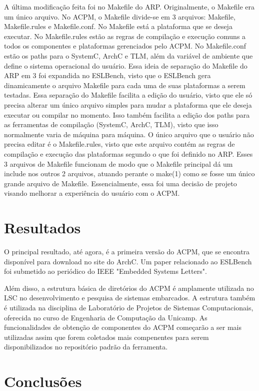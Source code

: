 \documentclass[12pt]{article}
\begin{document}
A última modificação feita foi no Makefile do ARP. Originalmente, o Makefile era
um único arquivo. No ACPM, o Makefile divide-se em 3 arquivos: Makefile,
Makefile.rules e Makefile.conf. No Makefile está a plataforma que se deseja
executar. No Makefile.rules estão as regras de compilação e execução comuns a
todos os componentes e plataformas gerenciados pelo ACPM. No Makefile.conf estão
os paths para o SystemC, ArchC e TLM, além da variável de ambiente que define o
sistema operacional do usuário. Essa ideia de separação do Makefile do ARP em 3
foi expandida no ESLBench, visto que o ESLBench gera dinamicamente o arquivo
Makefile para cada uma de suas plataformas a serem testadas. Essa separação do
Makefile facilita a edição do usuário, visto que ele só precisa alterar um único
arquivo simples para mudar a plataforma que ele deseja executar ou compilar no
momento. Isso também facilita a edição dos paths para as ferramentas de
compilação (SystemC, ArchC, TLM), visto que isso normalmente varia de máquina
para máquina. O único arquivo que o usuário não precisa editar é o
Makefile.rules, visto que este arquivo contém as regras de compilação e execução
das plataformas segundo o que foi definido no ARP. Esses 3 arquivos de Makefile
funcionam de modo que o Makefile principal dá um include nos outros 2 arquivos,
atuando perante o make(1) como se fosse um único grande arquivo de Makefile.
Essencialmente, essa foi uma decisão de projeto visando melhorar a experiência
do usuário com o ACPM.


\section{Resultados}

O principal resultado, até agora, é a primeira versão do ACPM, que se encontra
disponível para download no site do ArchC. Um paper relacionado ao ESLBench foi
submetido ao periódico do IEEE "Embedded Systems Letters".

Além disso, a estrutura básica de diretórios do ACPM é amplamente utilizada no
LSC no desenvolvimento e pesquisa de sistemas embarcados. A estrutura também é
utilizada na disciplina de Laboratório de Projetos de Sistemas Computacionais,
oferecida no curso de Engenharia de Computação da Unicamp.
As funcionalidades de obtenção de componentes do ACPM começarão a ser mais
utilizadas assim que forem coletados mais compenentes para serem
disponibilizados no repositório padrão da ferramenta.


\section{Conclusões}
\end{document}
